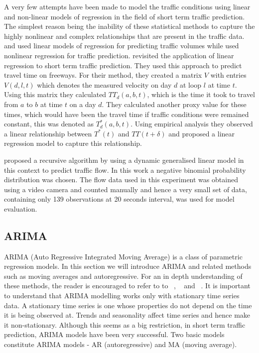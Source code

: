 A very few attempts have been made to model the traffic conditions using linear and non-linear
models of regression in the field of short term traffic prediction. The simplest reason being the
inability of these statistical methods to capture the highly nonlinear and complex relationships that
are present in the traffic data. \citet{low1972new} and \citet{jensen1973calibrating}
used linear models of regression for predicting traffic volumes while \citet{hogberg1976estimation}
used nonlinear regression for traffic prediction. \citet{rice2004simple} revisited the application of
linear regression to short term traffic prediction. They used this approach to predict travel time
on freeways. For their method, they created a matrix $V$ with entries $V(d,l,t)$ which denotes the
measured velocity on day $d$ at loop $l$ at time $t$. Using this matrix they calculated $TT_{d}(a,b,t)$,
which is the time it took to travel from $a$ to $b$ at time $t$ on a day $d$. They calculated another
proxy value for these times, which would have been the travel time if traffic conditions were remained
constant, this was denoted as $T^*_{d}(a,b,t)$. Using empirical analysis they observed a linear
relationship between $T^*(t)$ and $TT(t+\delta)$ and proposed a linear regression model to capture this
relationship.

\citet{lan1999real} proposed a recursive algorithm by using a dynamic generalised linear model
in this context to predict traffic flow. In this work a negative binomial probability distribution
was chosen. The flow data used in this experiment was obtained using a video camera and counted
manually and hence a very small set of data, containing only 139 observations at 20 seconds interval,
was used for model evaluation.

\subsection{ARIMA}
ARIMA (Auto Regressive Integrated Moving Average) is a class of parametric regression models. In
this section we will introduce ARIMA and related methods such as moving averages and autoregressive.
For an in depth understanding of these methods, the reader is encouraged to refer to to
~\citet{tong1990non}, ~\citet{brockwell2006introduction} and ~\citet{box2015time}. It is
important to understand that ARIMA modelling works only with stationary time series data. A
stationary time series is one whose properties do not depend on the time it is being observed at.
Trends and seasonality affect time series and hence make it non-stationary. Although this seems as a
big restriction, in short term traffic prediction, ARIMA models have been very successful. Two
basic models constitute ARIMA models - AR (autoregressive) and MA (moving average).

